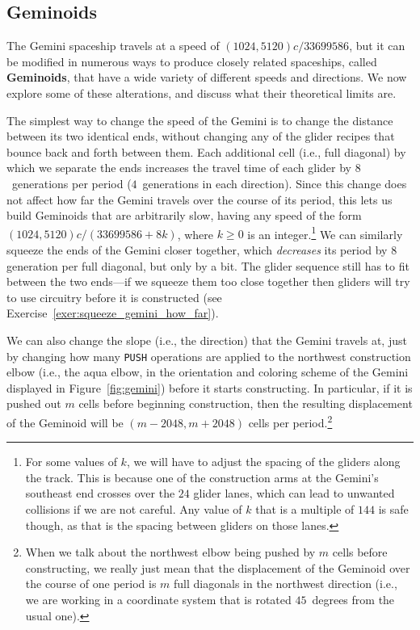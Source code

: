 \subsection{Geminoids}\label{sec:geminoids}

The Gemini spaceship travels at a speed of $(1024,5120)c/33699586$, but it can be modified in numerous ways to produce closely related spaceships, called \textbf{Geminoids}, that have a wide variety of different speeds and directions. We now explore some of these alterations, and discuss what their theoretical limits are.

The simplest way to change the speed of the Gemini is to change the distance between its two identical ends, without changing any of the glider recipes that bounce back and forth between them. Each additional cell (i.e., full diagonal) by which we separate the ends increases the travel time of each glider by $8$~generations per period ($4$~generations in each direction). Since this change does not affect how far the Gemini travels over the course of its period, this lets us build Geminoids that are arbitrarily slow, having any speed of the form $(1024,5120)c/(33699586 + 8k)$, where $k \geq 0$ is an integer.\footnote{For some values of $k$, we will have to adjust the spacing of the gliders along the track. This is because one of the construction arms at the Gemini's southeast end crosses over the $24$ glider lanes, which can lead to unwanted collisions if we are not careful. Any value of $k$ that is a multiple of $144$ is safe though, as that is the spacing between gliders on those lanes.} We can similarly squeeze the ends of the Gemini closer together, which \emph{decreases} its period by $8$ generation per full diagonal, but only by a bit. The glider sequence still has to fit between the two ends---if we squeeze them too close together then gliders will try to use circuitry before it is constructed (see Exercise~\ref{exer:squeeze_gemini_how_far}).

We can also change the slope (i.e., the direction) that the Gemini travels at, just by changing how many \texttt{PUSH} operations are applied to the northwest construction elbow (i.e., the aqua elbow, in the orientation and coloring scheme of the Gemini displayed in Figure~\ref{fig:gemini}) before it starts constructing. In particular, if it is pushed out $m$ cells before beginning construction, then the resulting displacement of the Geminoid will be $(m-2048,m+2048)$ cells per period.\footnote{When we talk about the northwest elbow being pushed by $m$ cells before constructing, we really just mean that the displacement of the Geminoid over the course of one period is $m$ full diagonals in the northwest direction (i.e., we are working in a coordinate system that is rotated $45$~degrees from the usual one).}

